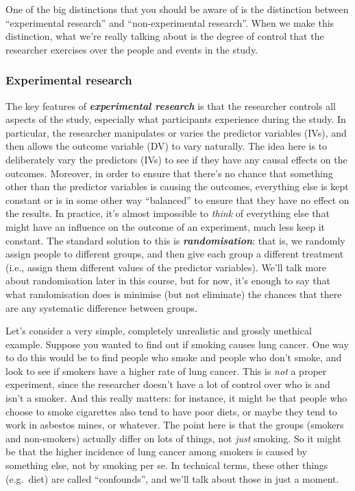 \documentclass[
]{book}
\begin{document}
One of the big distinctions that you should be aware of is the distinction between ``experimental research'' and ``non-experimental research''. When we make this distinction, what we're really talking about is the degree of control that the researcher exercises over the people and events in the study.

\hypertarget{experimental-research}{%
\subsubsection{Experimental research}\label{experimental-research}}

The key features of \textbf{\emph{experimental research}} is that the researcher controls all aspects of the study, especially what participants experience during the study. In particular, the researcher manipulates or varies the predictor variables (IVs), and then allows the outcome variable (DV) to vary naturally. The idea here is to deliberately vary the predictors (IVs) to see if they have any causal effects on the outcomes. Moreover, in order to ensure that there's no chance that something other than the predictor variables is causing the outcomes, everything else is kept constant or is in some other way ``balanced'' to ensure that they have no effect on the results. In practice, it's almost impossible to \emph{think} of everything else that might have an influence on the outcome of an experiment, much less keep it constant. The standard solution to this is \textbf{\emph{randomisation}}: that is, we randomly assign people to different groups, and then give each group a different treatment (i.e., assign them different values of the predictor variables). We'll talk more about randomisation later in this course, but for now, it's enough to say that what randomisation does is minimise (but not eliminate) the chances that there are any systematic difference between groups.

Let's consider a very simple, completely unrealistic and grossly unethical example. Suppose you wanted to find out if smoking causes lung cancer. One way to do this would be to find people who smoke and people who don't smoke, and look to see if smokers have a higher rate of lung cancer. This is \emph{not} a proper experiment, since the researcher doesn't have a lot of control over who is and isn't a smoker. And this really matters: for instance, it might be that people who choose to smoke cigarettes also tend to have poor diets, or maybe they tend to work in asbestos mines, or whatever. The point here is that the groups (smokers and non-smokers) actually differ on lots of things, not \emph{just} smoking. So it might be that the higher incidence of lung cancer among smokers is caused by something else, not by smoking per se. In technical terms, these other things (e.g.~diet) are called ``confounds'', and we'll talk about those in just a moment.
\end{document}
